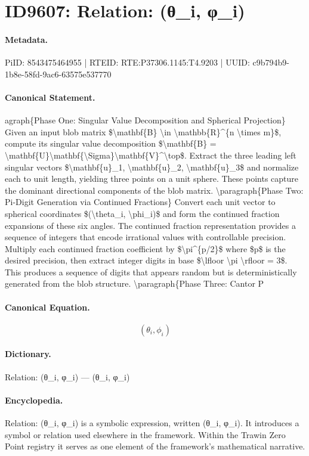 \section*{ID9607: Relation: (θ\_i, φ\_i)}
\paragraph{Metadata.}
PiID: 8543475464955 | RTEID: RTE:P37306.1145:T4.9203 | UUID: c9b794b9-1b8e-58fd-9ac6-63575e537770

\paragraph{Canonical Statement.}
agraph\{Phase One: Singular Value Decomposition and Spherical Projection\} Given an input blob matrix \$\textbackslash{}mathbf\{B\} \textbackslash{}in \textbackslash{}mathbb\{R\}\textasciicircum{}\{n \textbackslash{}times m\}\$, compute its singular value decomposition \$\textbackslash{}mathbf\{B\} = \textbackslash{}mathbf\{U\}\textbackslash{}mathbf\{\textbackslash{}Sigma\}\textbackslash{}mathbf\{V\}\textasciicircum{}\textbackslash{}top\$. Extract the three leading left singular vectors \$\textbackslash{}mathbf\{u\}\_1, \textbackslash{}mathbf\{u\}\_2, \textbackslash{}mathbf\{u\}\_3\$ and normalize each to unit length, yielding three points on a unit sphere. These points capture the dominant directional components of the blob matrix. \textbackslash{}paragraph\{Phase Two: Pi-Digit Generation via Continued Fractions\} Convert each unit vector to spherical coordinates \$(\textbackslash{}theta\_i, \textbackslash{}phi\_i)\$ and form the continued fraction expansions of these six angles. The continued fraction representation provides a sequence of integers that encode irrational values with controllable precision. Multiply each continued fraction coefficient by \$\textbackslash{}pi\textasciicircum{}\{p/2\}\$ where \$p\$ is the desired precision, then extract integer digits in base \$\textbackslash{}lfloor \textbackslash{}pi \textbackslash{}rfloor = 3\$. This produces a sequence of digits that appears random but is deterministically generated from the blob structure. \textbackslash{}paragraph\{Phase Three: Cantor P

\paragraph{Canonical Equation.}
\[
(\theta_i, \phi_i)
\]

\paragraph{Dictionary.}
Relation: (θ\_i, φ\_i) — (θ\_i, φ\_i)

\paragraph{Encyclopedia.}
Relation: (θ\_i, φ\_i) is a symbolic expression, written (θ\_i, φ\_i). It introduces a symbol or relation used elsewhere in the framework. Within the Trawin Zero Point registry it serves as one element of the framework's mathematical narrative.
